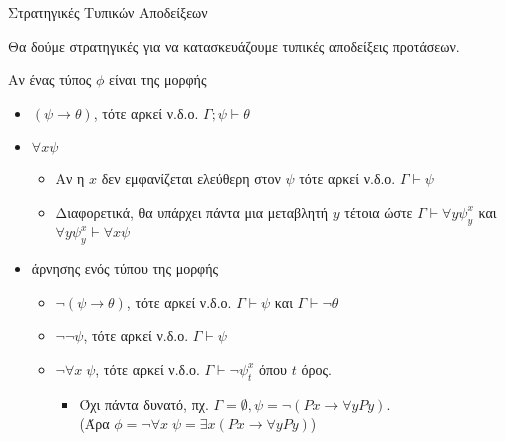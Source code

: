 \documentclass{beamer}
\begin{document}
\begin{frame}{Στρατηγικές Τυπικών Αποδείξεων}
  \begin{block}{}
    Θα δούμε στρατηγικές για να κατασκευάζουμε τυπικές αποδείξεις προτάσεων.
  \end{block}
  \begin{block}{}
    Αν ένας τύπος $\phi$ είναι της μορφής
    \begin{itemize}
      \item $(\psi \rightarrow \theta)$, τότε αρκεί ν.δ.ο. $\Gamma ; \psi \vdash \theta$
      \item $\forall x \psi$
        \begin{itemize}
          \item Αν η $x$ δεν εμφανίζεται ελεύθερη στον $\psi$ τότε αρκεί ν.δ.ο. $\Gamma \vdash \psi$
          \item Διαφορετικά, θα υπάρχει πάντα μια μεταβλητή $y$ τέτοια ώστε $\Gamma \vdash \forall y \psi_y^x$ και $\forall y \psi_y^x \vdash \forall x \psi$
        \end{itemize}
      \item άρνησης ενός τύπου της μορφής
        \begin{itemize}
          \item $\neg(\psi \rightarrow \theta)$, τότε αρκεί ν.δ.ο. $\Gamma \vdash \psi$ και $\Gamma \vdash \neg\theta$
          \item $\neg\neg\psi$, τότε αρκεί ν.δ.ο. $\Gamma \vdash \psi$
          \item $\neg\forall x \; \psi$, τότε αρκεί ν.δ.ο. $\Gamma \vdash \neg\psi_t^x$ όπου $t$ όρος.
            \begin{itemize}
              \item Όχι πάντα δυνατό, πχ. $\Gamma = \emptyset, \psi = \neg(Px \rightarrow \forall y Py)$.\\
              (Άρα $\phi = \neg\forall x \; \psi = \exists x (Px \rightarrow \forall y Py)$)
            \end{itemize}
        \end{itemize}
    \end{itemize}
  \end{block}
\end{frame}
\end{document}

